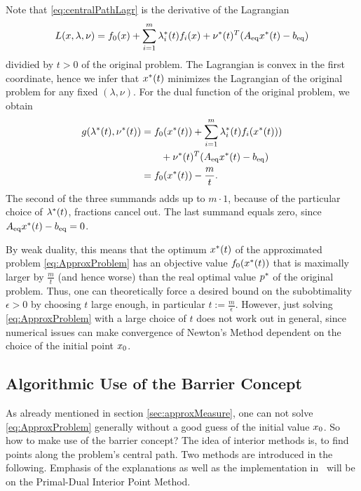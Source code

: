 Note that \eqref{eq:centralPathLagr} is the derivative of the Lagrangian 
\[ L(x,\lambda,\nu) = f_0(x) + \sum_{i=1}^{m}\lambda_i^*(t) f_i(x) + \nu^*(t) ^T ({A}_{\mathrm{eq}} x^*(t) - {b}_{\mathrm{eq}}) \]
 dividied by $ t>0 $ of the original problem.
The Lagrangian is convex in the first coordinate, hence we infer that $ x^*(t) $ minimizes the Lagrangian  of the original problem for any fixed $ (\lambda,\nu) $.
For the dual function of the original problem, we obtain
\begin{align}
\begin{split}
	g(\lambda^*(t),\nu^*(t)) &= f_0(x^*(t)) + \sum_{i=1}^{m} \lambda_i^*(t) f_i(x^*(t)))\\&\qquad+\nu^*(t) ^T ({A}_{\mathrm{eq}} x^*(t) - {b}_{\mathrm{eq}})\\ & = f_0(x^*(t)) - \frac{m}{t}.
\end{split}
\end{align}
The second of the three summands adds up to $ m\cdot 1 $, because of the particular choice of $ \lambda^*(t) $,  fractions cancel out. The last summand equals zero, since $ {A}_{\mathrm{eq}} x^*(t) - {b}_{\mathrm{eq}} = 0$.






By weak duality, this means that the optimum $ x^*(t) $ of the approximated problem \eqref{eq:ApproxProblem} has an objective value $ f_0(x^*(t)) $ that is maximally larger  by $ \frac{m}{t} $ (and hence worse) than the real optimal value $ p^* $ of the original problem. Thus, one can theoretically force a desired bound on the subobtimality $ \epsilon >0 $ by choosing $ t $ large enough, in particular $ t := \frac{m}{\epsilon} $. However, just solving \eqref{eq:ApproxProblem} with a large choice of $ t $ does not work out in general, since numerical issues can make convergence of Newton's Method dependent on the choice of the initial point $ x_0 $.
\label{sec:approxMeasure}

\subsection{Algorithmic Use of the Barrier Concept}
As already mentioned in section \ref{sec:approxMeasure}, one can not solve  \eqref{eq:ApproxProblem} generally without a good guess of the initial value $ x_0 $. So how to make use of the barrier concept? The idea of interior methods is, to find points along the problem's central path. Two methods are introduced in the following. Emphasis of the explanations as well as the implementation in \matlab \ will be on the Primal-Dual Interior Point Method.
